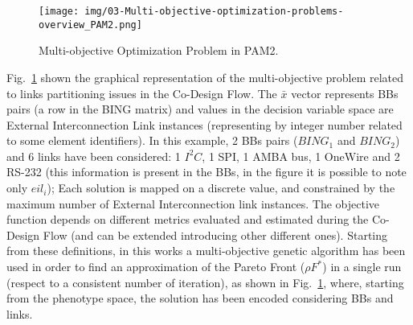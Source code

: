 %
%
\begin{figure}[htbp]
	\centerline{\texttt{[image: img/03-Multi-objective-optimization-problems-overview\_PAM2.png]}}
	\caption{Multi-objective Optimization Problem in PAM2.}
	\label{figMOGAOverview_PAM2}
\end{figure}
%
Fig.~\ref{figMOGAOverview_PAM2} shown the graphical representation of the multi-objective problem related to links partitioning issues in the Co-Design Flow. 
The $\bar x$ vector represents BBs pairs (a row in the BING matrix) and values in the decision variable space are External Interconnection Link instances (representing by integer number related to some element identifiers). 
In this example, 2 BBs pairs (${BING}_1$ and ${BING}_2$) and 6 links have been considered: 1 ${I}^{2}{C}$, 1 SPI, 1 AMBA bus, 1 OneWire and 2 RS-232 (this information is present in the BBs, in the figure it is possible to note only $eil_i$); Each solution is mapped on a discrete value, and constrained by the maximum number of External Interconnection link instances.
The objective function depends on different metrics evaluated and estimated during the Co-Design Flow (and can be extended introducing other different ones). Starting from these definitions, in this works a multi-objective genetic algorithm has been used in order to find an approximation of the Pareto Front ($\rho F^\ast$) in a single run (respect to a consistent number of iteration), as shown in Fig.~\ref{figMOGAOverview_PAM2}, where, starting from the phenotype space, the solution has been encoded considering BBs and links. 
%
%
%
